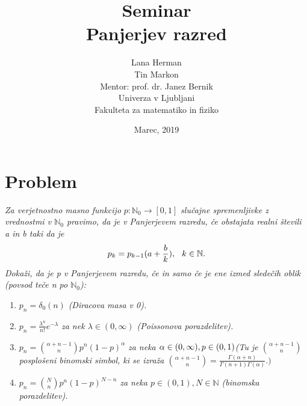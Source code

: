 \documentclass[a4paper]{article}
\title{Seminar \\\vspace{2cm} {\huge Panjerjev razred}\vspace{2cm}}
\author{Lana Herman \\[1.5mm] Tin Markon \\[1.5mm]\vspace{7cm}
Mentor: prof. dr. Janez Bernik \\
Univerza v Ljubljani \\[1.5mm]
Fakulteta za matematiko in fiziko \vspace{3cm}}
\date{Marec, 2019}
\begin{document}
\begin{titlepage}
\clearpage \maketitle
\thispagestyle{empty}
\end{titlepage} 


\tableofcontents
\pagebreak

\maketitle
\section{Problem}
\textit{Za verjetnostno masno funkcijo} $p : \mathbb{N}_{0} \rightarrow [0, 1]$ \textit{slučajne spremenljivke z vrednostmi v $\mathbb{N}_{0}$ pravimo, da je v Panjerjevem razredu, če obstajata realni števili a in b taki da je}
$$p_k = p_{k-1}(a + \frac{b}{k}), \hspace{0.25cm}  k \in \mathbb{N}.$$
\textit{Dokaži, da je p v Panjerjevem razredu, če in samo če je ene izmed sledečih oblik (povsod teče n po $\mathbb{N}_{0}$):}
\begin{enumerate}
	\item $p_n = \delta_{0}(n)$ \textit{(Diracova masa v 0).}
	\item $p_n = \frac{\lambda^n}{n!}e^{-\lambda}$ \textit{za nek $\lambda \in (0, \infty)$ (Poissonova porazdelitev).}
	\item $p_n = {{\alpha + n - 1}\choose n}p^n(1-p)^{\alpha}$ \textit{za neka $\alpha \in (0, \infty), p \in (0,1) \\ $(Tu je ${{\alpha + n - 1}\choose n}$ posplošeni binomski simbol, ki se izraža ${{\alpha + n - 1}\choose n}=\frac{\Gamma(\alpha + n)}{\Gamma(n+1)\Gamma(\alpha)}.)$}
	\item $p_n = {N \choose n}p^n(1-p)^{N-n}$ \textit{za neka $p \in (0,1), N \in \mathbb{N}$ (binomska porazdelitev).}
\end{enumerate}
\vspace{0.5cm}
\end{document}
